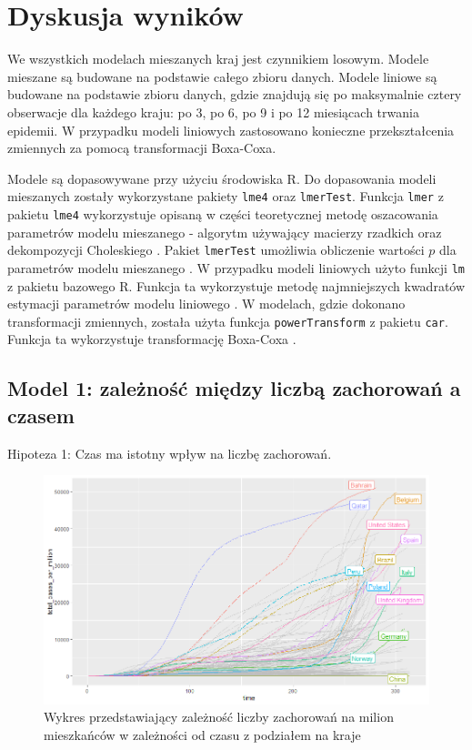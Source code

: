 \documentclass[12pt]{mwbk}
\theoremstyle{plain}
\theoremstyle{definition}
\theoremstyle{remark}
\newcommand\zrodlo[1]{\par\vspace{-3mm}{\small\textit{Źródło: }#1 }}
\begin{document}
\section{Dyskusja wyników}

We wszystkich modelach mieszanych kraj jest czynnikiem losowym. Modele mieszane są budowane na podstawie całego zbioru danych. Modele liniowe są budowane na podstawie zbioru danych, gdzie znajdują się po maksymalnie cztery obserwacje dla każdego kraju: po 3, po 6, po 9 i po 12 miesiącach trwania epidemii. W przypadku modeli liniowych zastosowano konieczne przekształcenia zmiennych za pomocą transformacji Boxa-Coxa.

Modele są dopasowywane przy użyciu środowiska R. Do dopasowania modeli mieszanych zostały wykorzystane pakiety \texttt{lme4} oraz \texttt{lmerTest}. Funkcja \texttt{lmer} z pakietu \texttt{lme4} wykorzystuje opisaną w części teoretycznej metodę oszacowania parametrów modelu mieszanego - algorytm używający macierzy rzadkich oraz dekompozycji Choleskiego \cite{lme4}. Pakiet \texttt{lmerTest} umożliwia obliczenie wartości $p$ dla parametrów modelu mieszanego \cite{lmerTest}. W przypadku modeli liniowych użyto funkcji \texttt{lm} z pakietu bazowego R. Funkcja ta wykorzystuje metodę najmniejszych kwadratów estymacji parametrów modelu liniowego \cite{lm}. W modelach, gdzie dokonano transformacji zmiennych, została użyta funkcja \texttt{powerTransform} z pakietu \texttt{car}. Funkcja ta wykorzystuje transformację Boxa-Coxa \cite{powerTransform}.

\newpage

\subsection{Model 1: zależność między liczbą zachorowań a czasem}

Hipoteza 1: Czas ma istotny wpływ na liczbę zachorowań.

\begin{figure}[htbp]
	\centering
	\includegraphics[width=\linewidth]{rys/total_cases_countries.png}
	\caption{Wykres przedstawiający zależność liczby zachorowań na milion mieszkańców w zależności od czasu z podziałem na kraje}
	\label{fig:total_cases_countries}
	\zrodlo{Opracowanie własne}
\end{figure}
\end{document}
